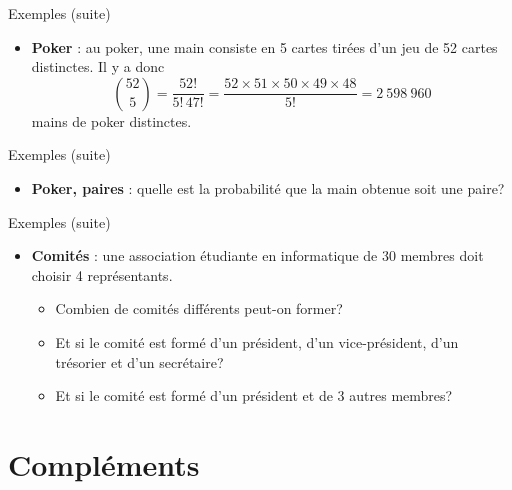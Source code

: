 \documentclass{BeamerTemplate}
\newcommand{\cibleReponse}{}
\newcommand{\lienreponse}[1]{\gdef\cibleReponse{#1}}
\begin{document}
\begin{frame}{Exemples (suite)}
 \begin{itemize}
  \item<1->{\bf Poker} : au poker, une main consiste en 5 cartes tirées d'un jeu de 52 cartes
  distinctes. Il y a donc
  $${52\choose5}=\frac{52!}{5!\,47!}=\frac{52\times51\times50\times49\times48}{5!}=
  2~598~960$$
  mains de poker distinctes.
 \end{itemize}
\end{frame}

\begin{frame}[t,label=expoker]{Exemples (suite)}


 \begin{itemize}
  \item{\bf Poker, paires} : quelle est la probabilité que la main obtenue soit une paire?\\
 \end{itemize}

   \vspace{0.1in}
\vspace{0.1in}


\lienreponse{rep-ex2}
\end{frame}

\begin{frame}[t,label=excomites]{Exemples (suite)}
 \begin{itemize}
  \item<1->{\bf Comités} : une association étudiante en informatique de 30 membres doit choisir 4 représentants.
  \begin{itemize} \itemsep1.3cm
  \item Combien de comités différents peut-on former?
  \item Et si le comité est formé d'un président, d'un vice-président, d'un trésorier
  et d'un secrétaire?
  \item Et si le comité est formé d'un président et de 3 autres membres?
  \end{itemize}
 \end{itemize}
\lienreponse{rep-ex2}
\end{frame}

\section{Compléments}
\end{document}
